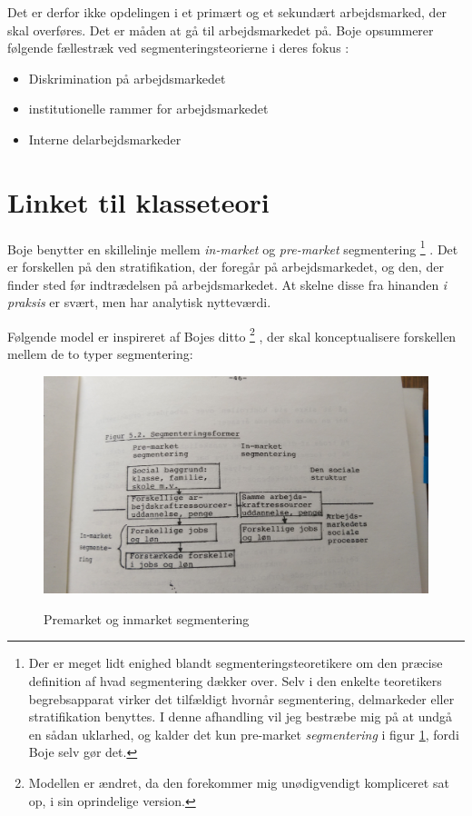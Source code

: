 Det er derfor ikke opdelingen i et primært og et sekundært arbejdsmarked, der skal overføres. Det er måden at gå til arbejdsmarkedet på. Boje opsummerer følgende fællestræk ved segmenteringsteorierne i deres fokus \parencite[106]{BojeToft1989}:  
%
\begin{itemize}
\itemsep-0.7em  
  	\item Diskrimination på arbejdsmarkedet
  	\item institutionelle rammer for arbejdsmarkedet
	\item Interne delarbejdsmarkeder
\end{itemize}
%

\section{Linket til klasseteori \label{sec_ teori ast linktilklasse}}


Boje benytter en skillelinje mellem \emph{in-market} og \emph{pre-market} segmentering%
\footnote{ Der er meget lidt enighed blandt segmenteringsteoretikere om den præcise definition af hvad segmentering dækker over. Selv i den enkelte teoretikers begrebsapparat virker det tilfældigt hvornår segmentering, delmarkeder eller stratifikation benyttes. I denne afhandling vil jeg bestræbe mig på at undgå en sådan uklarhed, og kalder det kun pre-market \emph{segmentering} i figur \ref{fig_premarketinmarket}, fordi Boje selv gør det.}%
%
. Det er forskellen på den stratifikation, der foregår på arbejdsmarkedet, og den, der finder sted før indtrædelsen på arbejdsmarkedet. At skelne disse fra hinanden \emph{i praksis} er svært, men har analytisk nytteværdi. 

Følgende model er inspireret af Bojes ditto \citeyear[46]{Boje1985}%
%
    \footnote{  Modellen er ændret, da den forekommer mig unødigvendigt kompliceret sat op, i sin oprindelige version.}%
%
, der skal konceptualisere forskellen mellem de to typer segmentering:
%
   \begin{figure}[H]
   \begin{centering}
   	\caption{Premarket og inmarket segmentering}
   	\includegraphics[width=\textwidth]{fig/Boje_premarket_inmarket.jpg}
   	\label{fig_premarketinmarket}
   \end{centering}
   \end{figure}   
%

